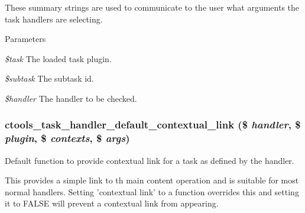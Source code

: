 These summary strings are used to communicate to the user what arguments the task handlers are selecting.


\begin{DoxyParams}{Parameters}
\item[{\em \$task}]The loaded task plugin. \item[{\em \$subtask}]The subtask id. \item[{\em \$handler}]The handler to be checked. \end{DoxyParams}
\hypertarget{context-task-handler_8inc_a4edcfd0731cd41013df2abcd6c63b0c4}{
\subsubsection[{ctools\_\-task\_\-handler\_\-default\_\-contextual\_\-link}]{\setlength{\rightskip}{0pt plus 5cm}ctools\_\-task\_\-handler\_\-default\_\-contextual\_\-link (\$ {\em handler}, \/  \$ {\em plugin}, \/  \$ {\em contexts}, \/  \$ {\em args})}}
\label{context-task-handler_8inc_a4edcfd0731cd41013df2abcd6c63b0c4}
Default function to provide contextual link for a task as defined by the handler.

This provides a simple link to th main content operation and is suitable for most normal handlers. Setting 'contextual link' to a function overrides this and setting it to FALSE will prevent a contextual link from appearing. 